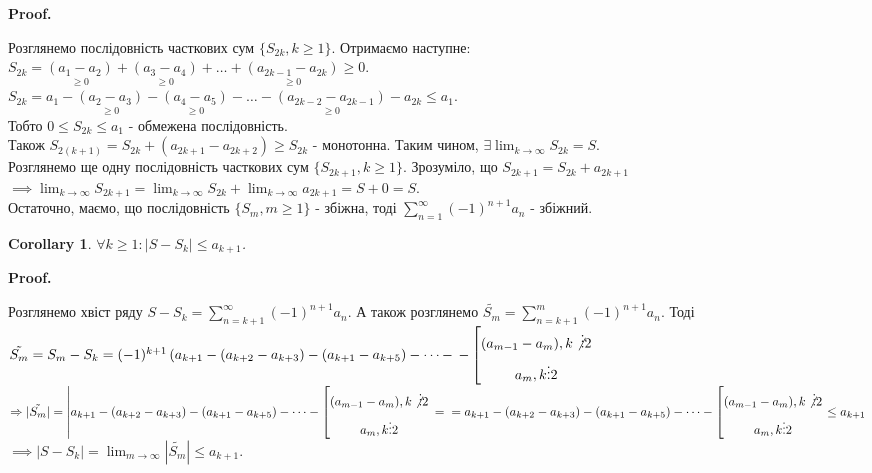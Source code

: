 \documentclass[a4paper, 10pt]{article}
\makeatletter
\def\huge{\displaystyle}
\def\qed{$\blacksquare$}
\theoremstyle{theoremdd}
\theoremstyle{theoremdd}
\theoremstyle{theoremdd}
\theoremstyle{theoremdd}
\theoremstyle{theoremdd}
\theoremstyle{theoremdd}
\theoremstyle{theoremdd}
\theoremstyle{theoremdd}
\newtheorem{corollary}[theorem]{Corollary}
\renewenvironment{proof}[1][Proof.\\]{\par
\pushQED{\hfill \qed}%
\normalfont \topsep6\p@\@plus6\p@\relax
\trivlist
\item\relax
{\bfseries
#1\@addpunct{.}}\hspace\labelsep\ignorespaces
}{%
\popQED\endtrivlist\@endpefalse
}
\makeatother
\begin{document}
\begin{proof}
Розглянемо послідовність часткових сум $\{S_{2k}, k \geq 1 \}$. Отримаємо наступне:\\
$S_{2k} = \underset{\geq 0}{(a_1 - a_2)} + \underset{\geq 0}{(a_3 - a_4)} + \dots + \underset{\geq 0}{(a_{2k-1} - a_{2k})} \geq 0$.\\
$S_{2k} = a_1 - \underset{\geq 0}{(a_2 - a_3)} - \underset{\geq 0}{(a_4 - a_5)} - \dots - \underset{\geq 0}{(a_{2k-2} - a_{2k-1})} - a_{2k} \leq a_1$.\\
Тобто $0 \leq S_{2k} \leq a_1$ - обмежена послідовність.\\
Також $S_{2(k+1)} = S_{2k} + (a_{2k+1}-a_{2k+2}) \geq S_{2k}$ - монотонна. Таким чином, $\exists \huge \lim_{k \to \infty} S_{2k} = S$.\\
Розглянемо ще одну послідовність часткових сум $\{S_{2k+1}, k \geq 1\}$. Зрозуміло, що $S_{2k+1} = S_{2k} + a_{2k+1}$\\
$\implies \huge \lim_{k \to \infty} S_{2k+1} = \lim_{k \to \infty} S_{2k} + \lim_{k \to \infty} a_{2k+1} = S + 0 = S$. \\
Остаточно, маємо, що послідовність $\{S_m, m \geq 1\}$ - збіжна, тоді $\huge \sum_{n=1}^\infty (-1)^{n+1}a_n$ - збіжний.
\end{proof}

\begin{corollary}
$\forall k \geq 1: |S-S_k| \leq a_{k+1}$.
\end{corollary}

\begin{proof}
Розглянемо хвіст ряду $S-S_k = \huge \sum_{n=k+1}^{\infty} (-1)^{n+1}a_n$. А також розглянемо $\tilde{S_m} = \huge \sum_{n=k+1}^{m} (-1)^{n+1}a_n$. Тоді\\
$\tilde{S_m} = S_m - S_k = (-1)^{k+1} \left(a_{k+1}-(a_{k+2}-a_{k+3})-(a_{k+1}-a_{k+5}) - \dots - \right. \left. - \left[ \begin{gathered} (a_{m-1}-a_m), k \not \vdots 2 \\ a_m, k \vdots 2 \end{gathered} \right. \right.$\\
$\Rightarrow |\tilde{S_m}| = \left|a_{k+1}-(a_{k+2}-a_{k+3})-(a_{k+1}-a_{k+5}) - \dots - \left[ \begin{gathered} (a_{m-1}-a_m), k \not \vdots 2 \\ a_m, k \vdots 2 \end{gathered} \right. \right. = \\
= a_{k+1}-(a_{k+2}-a_{k+3})-(a_{k+1}-a_{k+5}) - \dots - \left[ \begin{gathered} (a_{m-1}-a_m), k \not \vdots 2 \\ a_m, k \vdots 2 \end{gathered} \right. \leq a_{k+1}$\\
$\implies |S - S_k| = \huge \lim_{m \to \infty} |\tilde{S_m}| \leq a_{k+1}$. \end{proof}
\end{document}
